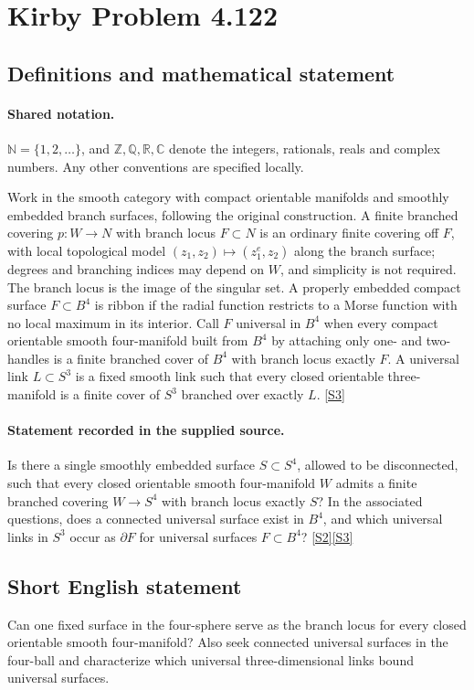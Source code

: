 \documentclass[11pt]{book}
\newcommand{\sref}[2]{\hyperlink{source:#1:#2}{[S#2]}}
\begin{document}
\section{Kirby Problem 4.122}\label{statement}

\subsection{Definitions and mathematical statement}

\paragraph{Shared notation.}$\mathbb N=\{1,2,\ldots\}$, and $\mathbb Z,\mathbb Q,\mathbb R,\mathbb C$ denote the integers, rationals, reals and complex numbers. Any other conventions are specified locally.


Work in the smooth category with compact orientable manifolds and smoothly embedded branch surfaces, following the original construction. A finite branched covering $p:W\to N$ with branch locus $F\subset N$ is an ordinary finite covering off $F$, with local topological model $(z_1,z_2)\mapsto(z_1^e,z_2)$ along the branch surface; degrees and branching indices may depend on $W$, and simplicity is not required. The branch locus is the image of the singular set. A properly embedded compact surface $F\subset B^4$ is ribbon if the radial function restricts to a Morse function with no local maximum in its interior. Call $F$ universal in $B^4$ when every compact orientable smooth four-manifold built from $B^4$ by attaching only one- and two-handles is a finite branched cover of $B^4$ with branch locus exactly $F$. A universal link $L\subset S^3$ is a fixed smooth link such that every closed orientable three-manifold is a finite cover of $S^3$ branched over exactly $L$. \sref{statement}{3}
\paragraph{Statement recorded in the supplied source.}
Is there a single smoothly embedded surface $S\subset S^4$, allowed to be disconnected, such that every closed orientable smooth four-manifold $W$ admits a finite branched covering $W\to S^4$ with branch locus exactly $S$? In the associated questions, does a connected universal surface exist in $B^4$, and which universal links in $S^3$ occur as $\partial F$ for universal surfaces $F\subset B^4$? \sref{statement}{2}\sref{statement}{3}
\subsection{Short English statement}
Can one fixed surface in the four-sphere serve as the branch locus for every closed orientable smooth four-manifold? Also seek connected universal surfaces in the four-ball and characterize which universal three-dimensional links bound universal surfaces.
\end{document}

